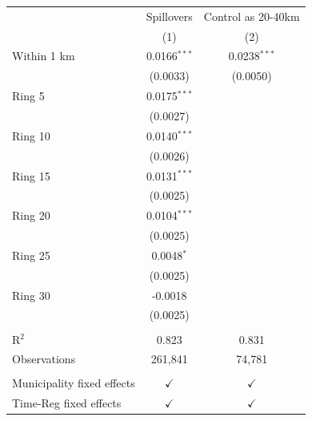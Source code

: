 \begingroup
\centering
\begin{tabular}{lcc}
   \toprule
                                 & Spillovers     & Control as 20-40km \\   
                                 & (1)            & (2)\\  
   \midrule 
   Within 1 km                   & 0.0166$^{***}$ & 0.0238$^{***}$\\   
                                 & (0.0033)       & (0.0050)\\   
   Ring 5                        & 0.0175$^{***}$ &   \\   
                                 & (0.0027)       &   \\   
   Ring 10                       & 0.0140$^{***}$ &   \\   
                                 & (0.0026)       &   \\   
   Ring 15                       & 0.0131$^{***}$ &   \\   
                                 & (0.0025)       &   \\   
   Ring 20                       & 0.0104$^{***}$ &   \\   
                                 & (0.0025)       &   \\   
   Ring 25                       & 0.0048$^{*}$   &   \\   
                                 & (0.0025)       &   \\   
   Ring 30                       & -0.0018        &   \\   
                                 & (0.0025)       &   \\   
    \\
   R$^2$                         & 0.823          & 0.831\\  
   Observations                  & 261,841        & 74,781\\  
    \\
   Municipality fixed effects & $\checkmark$   & $\checkmark$\\   
   Time-Reg fixed effects     & $\checkmark$   & $\checkmark$\\   
   \bottomrule
\end{tabular}
\par\endgroup
